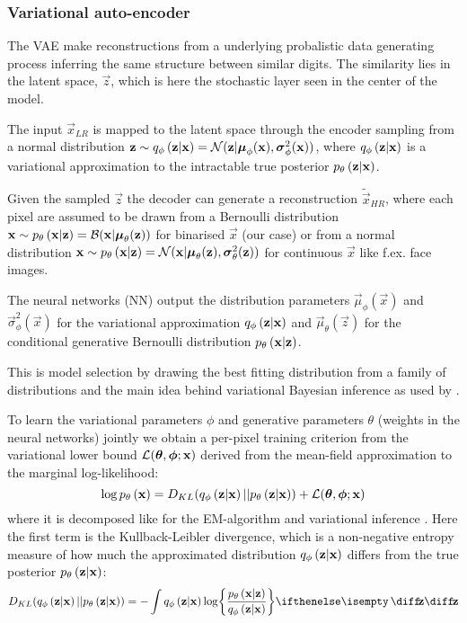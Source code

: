 \subsubsection{Variational auto-encoder}
\label{ssub:vae}
The VAE make reconstructions from a underlying probalistic data generating process inferring the same structure between similar digits. The similarity lies in the latent space, $\vec{z}$, which is here the stochastic layer seen in the center of the model. 

The input $\vec{x}_{LR}$ is mapped to the latent space through the encoder sampling from a normal distribution
$\bm{\mathrm{z}} \sim q_{\phi}\left(\bm{\mathrm{z}}|\bm{\mathrm{x}}\right) = \mathcal{N}( \bm{\mathrm{z}}|\bm{\mathrm{\mu}}_\phi(\bm{\mathrm{x}}),\bm{\mathrm{\sigma}}^2_\phi(\bm{\mathrm{x}}))$, where $q_{\phi}\left(\bm{\mathrm{z}}|\bm{\mathrm{x}}\right)$ is a variational approximation to the intractable true posterior $p_{\theta}\left(\bm{\mathrm{z}}|\bm{\mathrm{x}}\right)$. 

Given the sampled $\vec{z}$ the decoder can generate a reconstruction $\tilde{\vec{x}}_{HR}$, where each pixel are assumed to be drawn from a Bernoulli distribution $\bm{\mathrm{x}} \sim p_{\theta}\left(\bm{\mathrm{x}}|\bm{\mathrm{z}}\right)=\mathcal{B}( \bm{\mathrm{x}}|\bm{\mathrm{\mu}}_\theta(\bm{\mathrm{z}}))$ for binarised $\vec{x}$ (our case) or from a normal distribution $\bm{\mathrm{x}} \sim p_{\theta}\left(\bm{\mathrm{x}}|\bm{\mathrm{z}}\right)=\mathcal{N}( \bm{\mathrm{x}}|\bm{\mathrm{\mu}}_\theta(\bm{\mathrm{z}}),\bm{\mathrm{\sigma}}^2_\theta(\bm{\mathrm{z}}))$ for continuous $\vec{x}$ like f.ex. face images.

The neural networks (NN) output the distribution parameters $\vec{\mu}_\phi(\vec{x})$ and $\vec{\sigma}^2_\phi(\vec{x})$ for the variational approximation $q_{\phi}\left(\bm{\mathrm{z}}|\bm{\mathrm{x}}\right)$ and $\vec{\mu}_\theta(\vec{z})$ for the conditional generative Bernoulli distribution $p_{\theta}\left(\bm{\mathrm{x}}|\bm{\mathrm{z}}\right)$. 

This is model selection by drawing the best fitting distribution from a family of distributions and the main idea behind variational Bayesian inference as used by \cite{Kingma2013}. 
 
To learn the variational parameters $\phi$ and generative parameters $\theta$ (weights in the neural networks) jointly we obtain a per-pixel training criterion from the variational lower bound $\mathcal{L}(\bm{\mathrm{\theta}},\bm{\mathrm{\phi}};\bm{\mathrm{x}})$ derived from the mean-field approximation to the marginal log-likelihood:
\begin{equation}
	\log p_{\theta}\left(\bm{\mathrm{x}}\right) = D_{KL}( q_{\phi}\left(\bm{\mathrm{z}}|\bm{\mathrm{x}}\right)||p_{\theta}\left(\bm{\mathrm{z}}|\bm{\mathrm{x}}\right)) + \mathcal{L}(\bm{\mathrm{\theta}},\bm{\mathrm{\phi}};\bm{\mathrm{x}})
\end{equation} 
where it is decomposed like for the EM-algorithm and variational inference \cite[\S10.2]{Bishop2006}. Here the first term is the Kullback-Leibler divergence, which is a non-negative entropy measure of how much the approximated distribution $q_{\phi}\left(\bm{\mathrm{z}}|\bm{\mathrm{x}}\right)$  differs from the true posterior $p_{\theta}\left(\bm{\mathrm{z}}|\bm{\mathrm{x}}\right)$:
\begin{equation}
	D_{KL}\parens{ \enc{\vec{z}|\vec{x}}||\dec{\vec{z}|\vec{x}}} = -\int \enc{\vec{z}|\vec{x}} \log \curlies*{ \frac{\dec{\vec{x}|\vec{z}}}{\enc{\vec{z}|\vec{x}} } } \D{\vec{z}}
\end{equation}

